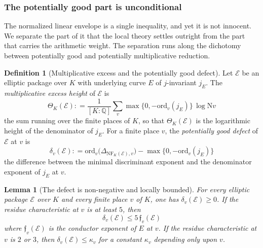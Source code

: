 \documentclass[10pt, reqno]{amsart}
\theoremstyle{plain}
\newtheorem{lemma}[theorem]{Lemma}
\theoremstyle{definition}
\newtheorem{definition}[theorem]{Definition}
\theoremstyle{plain}
\newcommand{\Q}{\mathbb{Q}}
\newcommand{\coloneqq}{\mathrel{\mathop:}=}
\begin{document}
\subsubsection{The potentially good part is unconditional}\label{subsubsec:PotentiallyGoodPart}

The normalized linear envelope is a single inequality, and yet it is not innocent. We separate the part of it that the local theory settles outright from the part that carries the arithmetic weight. The separation runs along the dichotomy between potentially good and potentially multiplicative reduction.

\begin{definition}[Multiplicative excess and the potentially good defect]
\label{def:MultiplicativeExcess}
Let $\mathcal{E}$ be an elliptic package over $K$ with underlying curve $E$ of $j$-invariant $j_{E}$. The \emph{multiplicative excess height} of $\mathcal{E}$ is
\[
  \Theta_{K}(\mathcal{E})
  \coloneqq
  \frac{1}{[K:\Q]}
  \sum_{v}
  \max\bigl\{0,-\mathrm{ord}_{v}(j_{E})\bigr\}\,\log \mathrm{N}v
\]
the sum running over the finite places of $K$, so that $\Theta_{K}(\mathcal{E})$ is the logarithmic height of the denominator of $j_{E}$. For a finite place $v$, the \emph{potentially good defect} of $\mathcal{E}$ at $v$ is
\[
  \delta_{v}(\mathcal{E})
  \coloneqq
  \mathrm{ord}_{v}\bigl(\Delta_{\mathrm{NF}_{K}(\mathcal{E}),v}\bigr)
  -
  \max\bigl\{0,-\mathrm{ord}_{v}(j_{E})\bigr\}
\]
the difference between the minimal discriminant exponent and the denominator exponent of $j_{E}$ at $v$.
\end{definition}

\begin{lemma}[The defect is non-negative and locally bounded]
\label{lem:PotentiallyGoodDefectBound}
For every elliptic package $\mathcal{E}$ over $K$ and every finite place $v$ of $K$, one has $\delta_{v}(\mathcal{E})\ge 0$. If the residue characteristic at $v$ is at least $5$, then
\[
  \delta_{v}(\mathcal{E})\le 5\,\mathfrak{f}_{v}(\mathcal{E})
\]
where $\mathfrak{f}_{v}(\mathcal{E})$ is the conductor exponent of $E$ at $v$. If the residue characteristic at $v$ is $2$ or $3$, then $\delta_{v}(\mathcal{E})\le\kappa_{v}$ for a constant $\kappa_{v}$ depending only upon $v$.
\end{lemma}
\end{document}
